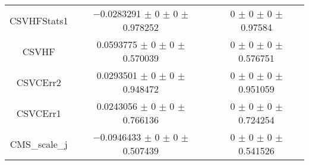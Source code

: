 \begin{table}
\begin{tabular}{ccc}
CSVHFStats1 & \num{-0.0283291} $\pm$ \num{0} $\pm$ \num{0} $\pm$ \num{0.978252} & \num{0} $\pm$ \num{0} $\pm$ \num{0} $\pm$ \num{0.97584}\\
CSVHF & \num{0.0593775} $\pm$ \num{0} $\pm$ \num{0} $\pm$ \num{0.570039} & \num{0} $\pm$ \num{0} $\pm$ \num{0} $\pm$ \num{0.576751}\\
CSVCErr2 & \num{0.0293501} $\pm$ \num{0} $\pm$ \num{0} $\pm$ \num{0.948472} & \num{0} $\pm$ \num{0} $\pm$ \num{0} $\pm$ \num{0.951059}\\
CSVCErr1 & \num{0.0243056} $\pm$ \num{0} $\pm$ \num{0} $\pm$ \num{0.766136} & \num{0} $\pm$ \num{0} $\pm$ \num{0} $\pm$ \num{0.724254}\\
CMS\_scale\_j & \num{-0.0946433} $\pm$ \num{0} $\pm$ \num{0} $\pm$ \num{0.507439} & \num{0} $\pm$ \num{0} $\pm$ \num{0} $\pm$ \num{0.541526}\\
\bottomrule
\end{tabular}
\end{table}